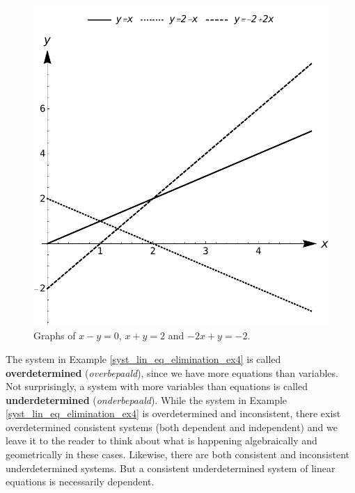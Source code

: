 \begin{example}
\begin{figure}[H]
	\centering
	\includegraphics[scale=0.6]{fig_Systems_lin_eq_5}
	\caption{Graphs of $x-y=0$, $x+y=2$ and $-2x+y = -2$.}
	\label{fig_Systems_lin_eq_5}
\end{figure}


\end{example}


The system in Example \ref{syst_lin_eq_elimination_ex4} is called   \textbf{overdetermined} (\textit{overbepaald}), since we have more equations than variables. Not surprisingly, a system with more variables than equations is called   \textbf{underdetermined} (\textit{onderbepaald}).  While the system in Example \ref{syst_lin_eq_elimination_ex4} is overdetermined and inconsistent, there exist overdetermined consistent systems (both dependent and independent) and we leave it to the reader to think about what is happening algebraically and geometrically in these cases.  Likewise, there are both consistent and inconsistent underdetermined systems. But a consistent underdetermined system of linear equations is necessarily dependent.

